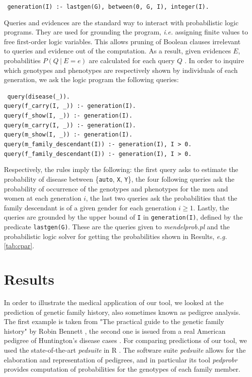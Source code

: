 \documentclass{eptcs}
\begin{document}
\begin{center} \tt
generation(I) :- lastgen(G), between(0, G, I), integer(I).
\end{center}



Queries and evidences are the standard way to interact with probabilistic logic programs. They are used for grounding the program, \textit{i.e.} assigning finite values to free first-order logic variables. This allows pruning of Boolean clauses irrelevant to queries and evidence out of the computation. As a result, given evidences $E$, probabilities $P(Q ~|~ E = e)$ are calculated for each query $Q$ \cite{fierens_inference_2015}. In order to inquire which genotypes and phenotypes are respectively shown by individuals of each generation, we ask the logic program the following queries:

\begin{center} \tt
{}
query(disease(\_)).\\
query(f\_carry(I, \_)) :- generation(I).\\
query(f\_show(I, \_)) :- generation(I).\\
query(m\_carry(I, \_)) :- generation(I).\\
query(m\_show(I, \_)) :- generation(I).\\
query(m\_family\_descendant(I)) :- generation(I), I > 0.\\
query(f\_family\_descendant(I)) :- generation(I), I > 0.
\end{center}

Respectively, the rules imply the following: the first query asks to estimate the probability of disease between \{\texttt{auto}, \texttt{X}, \texttt{Y}\}, the four following queries ask the probability of occurrence of the genotypes and phenotypes for the men and women at each generation $i$, the last two queries ask the probabilities that the family descendant is of a given gender for each generation $i \geq 1$. Lastly, the queries are grounded by the upper bound of \texttt{I} in \texttt{generation(I)}, defined by the predicate \texttt{lastgen(G)}. These are the queries given to \textit{mendelprob.pl} and the probabilistic logic solver for getting the probabilities shown in Results, \textit{e.g.} \autoref{tab:cpar}.


\section*{Results}

In order to illustrate the medical application of our tool, we looked at the prediction of genetic family history, also sometimes known as pedigree analysis. The first example is taken from "The practical guide to the genetic family history" by Robin Bennett \cite{bennett_practical_2011}, the second one is issued from a real American pedigree of Huntington's disease cases \cite{gusella_polymorphic_1983}. For comparing predictions of our tool, we used the state-of-the-art \textit{pedsuite} in R \cite{vigeland_pedigree_2021}.  The software suite \textit{pedsuite} allows for the elaboration and representation of pedigrees, and in particular its tool \textit{pedprobr} provides computation of probabilities for the genotypes of each family member.
\end{document}
